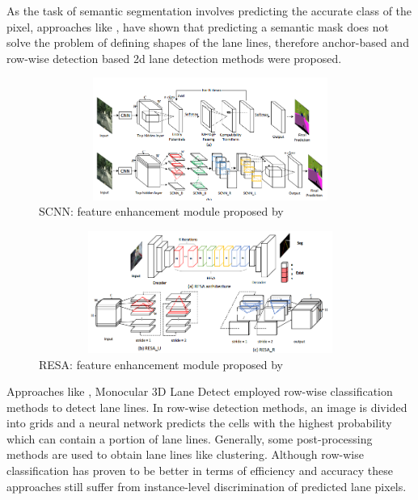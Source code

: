         As the task of semantic segmentation involves predicting the accurate class of the pixel, approaches like \cite{https://doi.org/10.48550/arxiv.2010.12035}, \cite{inbook} have shown that predicting a semantic mask does not solve the problem of defining shapes of the lane lines, therefore anchor-based and row-wise detection based 2d lane detection methods were proposed.
        
         \begin{figure}[h]
    \centering
\includegraphics[width=12cm, height=4cm]{images/scnn_module.png}
    \caption{SCNN: feature enhancement module proposed by  \cite{DBLP:journals/corr/abs-1712-06080}}
    \end{figure}
    
     \begin{figure}[h]
    \centering
\includegraphics[width=12cm, height=4cm]{images/resa_module.png}
    \caption{RESA: feature enhancement module proposed by \cite{DBLP:journals/corr/abs-2008-13719}}
    \end{figure}

 Approaches like \cite{DBLP:journals/corr/abs-2005-08630}, \cite{DBLP:journals/corr/abs-2004-11757}Monocular 3D Lane Detect employed row-wise classification methods to detect lane lines. In row-wise detection methods, an image is divided into grids and a neural network predicts the cells with the highest probability which can contain a portion of lane lines. Generally, some post-processing methods are used to obtain lane lines like clustering. Although row-wise classification has proven to be better in terms of efficiency and accuracy these approaches still suffer from instance-level discrimination of predicted lane pixels.
 
